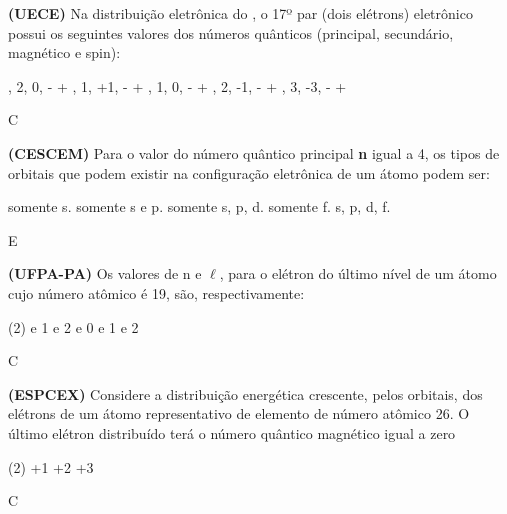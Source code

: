 \documentclass[9 pt]{scrartcl}
\def\PQ{0.84} %
\begin{document}
\begin{exercise}[points=\PQ]
\textbf{(UECE)} Na distribuição eletrônica do , o 17º par (dois elétrons) eletrônico possui os seguintes valores dos números quânticos (principal, secundário, magnético e spin):

\begin{choice}
, 2, 0, - +
, 1, +1, - +
, 1, 0, - +
, 2, -1, - +
, 3, -3, - +
\end{choice}
\end{exercise}
\begin{solution}
C
\end{solution}




\begin{exercise}[points=\PQ]
\textbf{(CESCEM)} Para o valor do número quântico principal \textbf{n} igual a 4, os tipos de orbitais que podem existir na configuração eletrônica de um átomo podem ser:
\begin{choice}
\choice somente s.
\choice somente s e p.
\choice somente s, p, d.
\choice somente f.
\choice s, p, d, f.
\end{choice}
\end{exercise}
\begin{solution}
E
\end{solution}


\begin{exercise}[points=\PQ]
\textbf{(UFPA-PA)} Os valores de n e \(\ell\), para o elétron do último nível de um átomo cujo número atômico é 19, são, respectivamente:

\begin{choice}(2)
 e 1
 e 2
 e 0
 e 1
 e 2
\end{choice}
\end{exercise}
\begin{solution}
C
\end{solution}



\begin{exercise}[points=\PQ]
\textbf{(ESPCEX)} Considere a distribuição energética crescente, pelos orbitais, dos elétrons de um átomo representativo de elemento de número atômico 26. O último elétron distribuído terá o número quântico magnético igual a zero
\begin{choice}(2)
\choice +1
\choice +2
\choice +3
\end{choice}
\end{exercise}
\begin{solution}
C
\end{solution}
\end{document}
